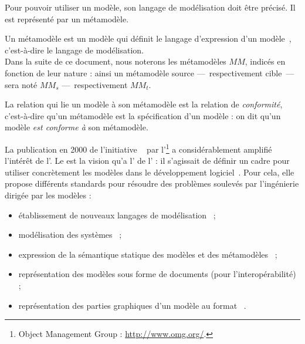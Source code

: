 Pour pouvoir utiliser un modèle, son langage de modélisation doit être précisé.
Il est représenté par un métamodèle.

\begin{definition}[Métamodèle]
Un métamodèle est un modèle qui définit le langage d'expression d'un
modèle~\cite{omgmof}, c'est-à-dire le langage de modélisation.\\
Dans la suite de ce document, nous noterons les métamodèles $MM$, indicés en
fonction de leur nature : ainsi un métamodèle source ---~respectivement cible~---
sera noté $MM_s$ ---~respectivement $MM_t$.
\end{definition}

La relation qui lie un modèle à son métamodèle est la relation de
\emph{conformité}, c'est-à-dire qu'un métamodèle est la spécification d'un
modèle : on dit qu'un modèle \emph{est conforme à} son métamodèle.

La publication en 2000 de l'initiative {\mda}~\cite{mda} par
l'{\omg}\footnote{Object Management Group : \url{http://www.omg.org/}.} a
considérablement amplifié l'intérêt de l'{\idm}. Le {\mda} est la vision qu'a
l'{\omg} de l'{\idm} : il s'agissait de définir un cadre pour utiliser
concrètement les modèles dans le développement logiciel~\cite{Kleppe2003,
Mellor2004}.
Pour cela, elle propose différents standards pour résoudre des problèmes
soulevés par l'ingénierie dirigée par les modèles :
\begin{itemize}
\item établissement de nouveaux langages de modélisation~\cite{omgmof} ;
\item modélisation des systèmes~\cite{uml2,uml241} ;
\item expression de la sémantique statique des modèles et des
  métamodèles~\cite{omgocl2} ;
\item représentation des modèles sous forme de documents {\xml} (pour
l'interopérabilité)\cite{omgxmi} ;
\item représentation des parties graphiques d'un modèle au format {\xml}~\cite{omgdi}.
\end{itemize}%

